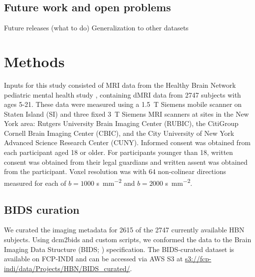 \documentclass[fleqn,10pt]{wlscirep}
\begin{document}
\subsection*{Future work and open problems}

Future releases (what to do)
Generalization to other datasets



\section*{Methods}

Inputs for this study consisted of MRI data from the Healthy Brain Network
pediatric mental health study \cite{alexander2017-yc}, containing dMRI data from
\num{2747} subjects with ages 5-21. These data were measured using a
\qty{1.5}{\tesla} Siemens mobile scanner on Staten Island (SI) and three fixed
\qty{3}{\tesla} Siemens MRI scanners at sites in the New York area: Rutgers
University Brain Imaging Center (RUBIC), the CitiGroup Cornell Brain Imaging
Center (CBIC), and the City University of New York Advanced Science Research
Center (CUNY). Informed consent was obtained from each participant aged 18 or
older. For participants younger than 18, written consent was obtained from their
legal guardians and written assent was obtained from the participant. Voxel
resolution was  with \num{64} non-colinear
directions measured for each of $b=1000$ \unit{\second \per \mm^{2}} and
$b=2000$ \unit{\second \per \mm^{2}}.

\subsection*{BIDS curation}

We curated the imaging metadata for \num{2615} of the \num{2747} currently
available HBN subjects. Using dcm2bids and custom scripts, we conformed the data
to the Brain Imaging Data Structure (BIDS; \cite{gorgolewski2016-lh})
specification.  The BIDS-curated dataset is available on FCP-INDI and can be
accessed via AWS S3 at \url{s3://fcp-indi/data/Projects/HBN/BIDS_curated/}.

\end{document}
